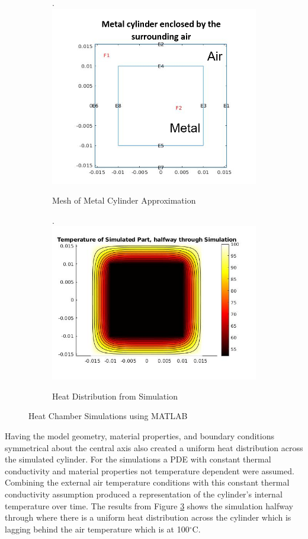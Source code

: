 \begin{figure}[!htb]
    \begin{subfigure}{.5\linewidth}.
        \centering
        \includegraphics[width=0.65\linewidth]{other/metal_cylinder_mesh.png}
        \caption{Mesh of Metal Cylinder Approximation}
        \label{fig:matlab_heatchamber}
    \end{subfigure}
    \begin{subfigure}{.5\linewidth}.
        \centering
        \includegraphics[width=0.7\linewidth]{other/transient_solution.png}
        \caption{Heat Distribution from Simulation}
        \label{fig:transient_solution}
    \end{subfigure}
    \caption{Heat Chamber Simulations using MATLAB}
\end{figure}

Having the model geometry, material properties, and boundary conditions symmetrical about the central axis also created a uniform heat distribution across the simulated cylinder. %
For the simulations a PDE with constant thermal conductivity and material properties not temperature dependent were assumed. %
Combining the external air temperature conditions with this constant thermal conductivity assumption produced a representation of the cylinder’s internal temperature over time. 
The results from Figure \ref{fig:transient_solution} shows the simulation halfway through where there is a uniform heat distribution across the cylinder which is lagging behind the air temperature which is at 100$^\circ$C.

